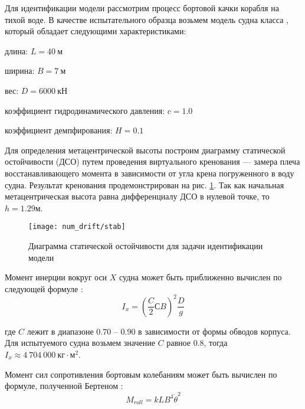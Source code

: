 Для идентификации модели рассмотрим процесс бортовой качки корабля на тихой воде.
В качестве испытательного образца возьмем модель судна класса , который обладает следующими характеристиками:

\begin{description}
	\item	длина: $L = 40\ \text{м}$
	\item	ширина: $B = 7\ \text{м}$
	\item	вес: $D = 6 000\ \text{кН}$
	\item	коэффициент гидродинамического давления: $c = 1.0$
	\item	коэффициент демпфирования: $H = 0.1$
\end{description}

Для определения метацентрической высоты построим диаграмму статической остойчивости (ДСО) путем проведения виртуального кренования --- замера плеча восстанавливающего момента в зависимости от угла крена погруженного в воду судна. Результат кренования продемонстрирован на рис. \ref{drift:stab}. Так как начальная метацентрическая высота равна дифференциалу ДСО в нулевой точке, то $h=1.29 м$.

\begin{figure}[h!]
\begin{center}
\texttt{[image: num\_drift/stab]}
\end{center}
\caption{Диаграмма статической остойчивости для задачи идентификации модели}
\label{drift:stab}
\end{figure}


Момент инерции вокруг оси $X$ судна может быть приближенно вычислен по следующей формуле \citep{hanovich47}:
\begin{equation}
	I_{x} = (\frac{C}{2}СB)^2 \frac{D}{g}
	\label{roll_torque}
\end{equation}


где $C$ лежит в диапазоне $0.70$ -- $0.90$ в зависимости от формы обводов корпуса. Для испытуемого судна возьмем значение $C$ равное $0.8$, тогда $I_x \approx 4\ 704\ 000\ \text{кг}\cdot \text{м}^2$.

Момент сил сопротивления бортовым колебаниям может быть вычислен по формуле, полученной Бертеном \citep{hanovich47}:
\begin{equation}
	M_{roll} = kLB^4\dot{\theta}^2
	\label{roll_torque}
\end{equation}

